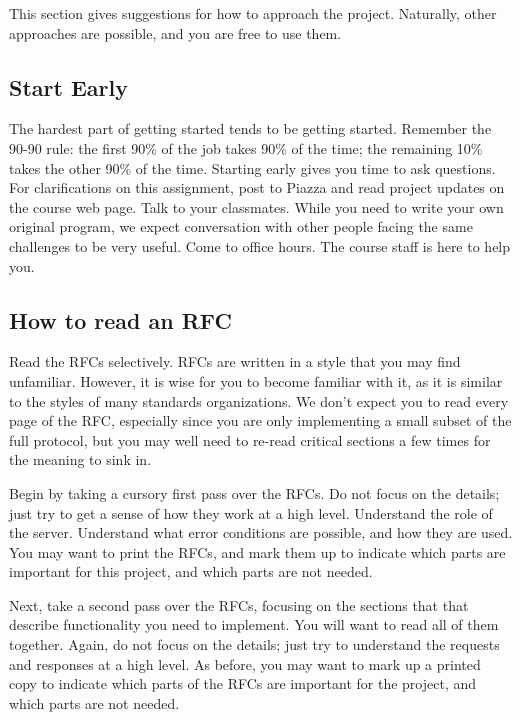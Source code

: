 This section gives suggestions for how to approach the project. Naturally, other
approaches are possible, and you are free to use them.

\subsection{Start Early}
	The hardest part of getting started tends to be
	  getting started. Remember the 90-90 rule: the first 90\% of the job takes
	  90\% of the time; the remaining 10\% takes the other 90\% of the time.
	  Starting early gives you time to ask questions. For clarifications on
	  this assignment, post to Piazza and read project updates on the course
	  web page.  Talk to your classmates. While you need to write your own
	  original program, we expect conversation with other people facing the
	  same challenges to be very useful. Come to office hours. The course staff
	  is here to help you.

\subsection{How to read an RFC}
	 
   Read the RFCs selectively. RFCs are written in a style that you may
      find unfamiliar. However, it is wise for you to become familiar with it,
      as it is similar to the styles of many standards organizations. We don't
      expect you to read every page of the RFC, especially since you are only
      implementing a small subset of the full protocol, but you may well need to
      re-read critical sections a few times for the meaning to sink in.

	 Begin by taking a cursory first pass over the RFCs. Do not focus on
      the details; just try to get a sense of how they work at a high
      level. Understand the role of the server. Understand what error conditions
      are possible, and how they are used. You may want to print the RFCs, and
      mark them up to indicate which parts are important for this project, and
      which parts are not needed. 

	 Next, take a second pass over the RFCs, focusing on the sections that 
      that describe functionality you need to implement. You will want to read all of
      them together.  Again, do not focus on the details; just try to understand
      the requests and responses at a high level. As before, you may want to
      mark up a printed copy to indicate which parts of the RFCs are important
      for the project, and which parts are not needed.  

